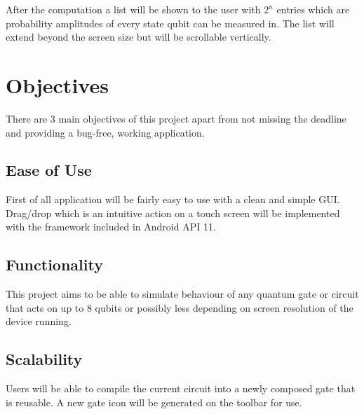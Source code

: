 \documentclass[12pt]{article}
\begin{document}
After the computation a list will be shown to the user with $2^n$ entries which are\\ probability amplitudes of every state qubit can be measured in. 
The list will extend beyond the screen size but will be scrollable vertically.

\section{Objectives}
There are 3 main objectives of this project apart from not missing the deadline and providing a bug-free, working application.
\subsection{Ease of Use}

First of all application will be fairly easy to use with a clean and simple GUI. Drag/drop which is an intuitive action on a touch screen will be implemented with the framework included in Android API 11. 

\subsection{Functionality}

This project aims to be able to simulate behaviour of any quantum 
gate or circuit that acts on up to 8 qubits or possibly less depending on screen resolution
of the device running.
\subsection{Scalability}

Users will be able to compile the current circuit into a newly composed gate that is reusable. A new gate icon will
be generated on the toolbar for use. 
\end{document}
